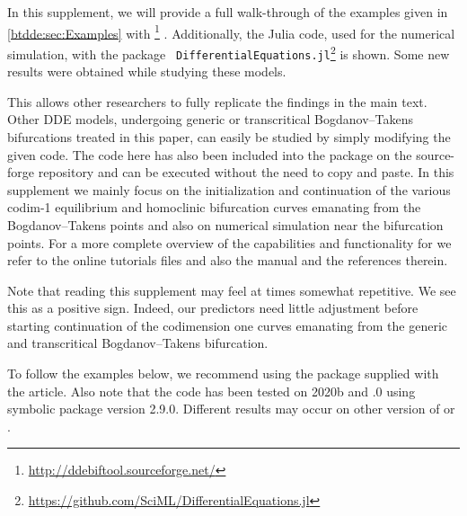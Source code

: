In this supplement, we will provide a full walk-through of the examples given
in \cref{btdde:sec:Examples} with
\DDEBIFTOOL\footnote{\url{http://ddebiftool.sourceforge.net/}}
\cite{2014arXiv1406.7144S}. Additionally, the Julia code, used for the
numerical simulation, with the package {\tt
DifferentialEquations.jl}\footnote{\url{https://github.com/SciML/DifferentialEquations.jl}}
\cite{rackauckas2017differentialequations} is shown. Some new results were
obtained while studying these models.

This allows other researchers to fully replicate the findings in the main text.
Other DDE models, undergoing generic or transcritical Bogdanov--Takens
bifurcations treated in this paper, can easily be studied by simply modifying
the given code. The code here has also been included into the \DDEBIFTOOL
package on the source-forge repository and can be executed without the need to
copy and paste. In this supplement we mainly focus on the initialization and
continuation of the various codim-1 equilibrium and homoclinic bifurcation
curves emanating from the Bogdanov--Takens points and also on numerical
simulation near the bifurcation points. For a more complete overview of the
capabilities and functionality for \DDEBIFTOOL we refer to the online tutorials
files and also the manual and the references therein.

Note that reading this supplement may feel at times somewhat repetitive. We see
this as a positive sign. Indeed, our predictors need little adjustment
before starting continuation of the codimension one curves emanating from the
generic and transcritical Bogdanov--Takens bifurcation.

To follow the examples below, we recommend using the \DDEBIFTOOL package
supplied with the article. Also note that the \MATLAB code has been tested on 
\MATLAB 2020b and .0 using \OCTAVE symbolic
package version 2.9.0. Different results may occur on other version of 
\MATLAB or \OCTAVE.


